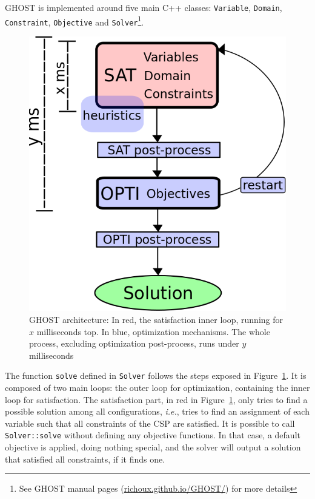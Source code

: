 \documentclass[journal]{IEEEtran}
\newcommand{\csp}{\textsc{CSP}\xspace}
\newcommand{\ghost}{\textsc{GHOST}\xspace}
\newcommand{\ie}{\textit{i.e.}}
\begin{document}
\ghost is implemented around five main C++ classes: \texttt{Variable},
\texttt{Domain},    \texttt{Constraint},     \texttt{Objective}    and
\texttt{Solver}\footnote{See        \ghost         manual        pages
  (\href{http://richoux.github.io/GHOST/}{richoux.github.io/GHOST/})
  for more  details}. %
\begin{figure}[th]
  \centering
  \includegraphics[width=\columnwidth]{figs/archi2.png}
  \caption{\ghost architecture:  In red, the satisfaction  inner loop,
    running  for   $x$  milliseconds   top.   In   blue,  optimization
    mechanisms.    The    whole   process,    excluding   optimization
    post-process, runs under $y$ milliseconds}
  \label{fig:archi}
\end{figure}

The  function \texttt{solve}  defined in  \texttt{Solver} follows  the
steps exposed  in Figure~\ref{fig:archi}. It  is composed of  two main
loops: the outer loop for  optimization, containing the inner loop for
satisfaction.      The     satisfaction     part,    in     red     in
Figure~\ref{fig:archi}, only  tries to find a  possible solution among
all configurations, \ie, tries to  find an assignment of each variable
such that all constraints of the \csp are satisfied. It is possible to
call \texttt{Solver::solve} without  defining any objective functions.
In that case,  a default objective is applied,  doing nothing special,
and the solver will output  a solution that satisfied all constraints,
if it finds one.
\end{document}
